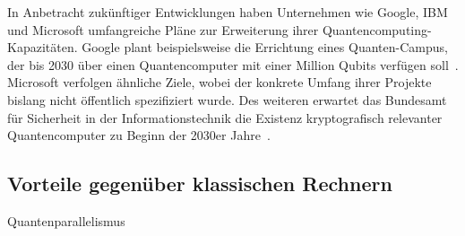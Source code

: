 In Anbetracht zukünftiger Entwicklungen haben Unternehmen wie Google, IBM und Microsoft umfangreiche Pläne zur Erweiterung ihrer Quantencomputing-Kapazitäten. 
Google plant beispielsweise die Errichtung eines Quanten-Campus, der bis 2030 über einen Quantencomputer mit einer Million Qubits verfügen soll~\cite{Google_2023}. 
Microsoft verfolgen ähnliche Ziele, wobei der konkrete Umfang ihrer Projekte bislang nicht öffentlich spezifiziert wurde.
Des weiteren erwartet das Bundesamt für Sicherheit in der Informationstechnik die Existenz kryptografisch relevanter Quantencomputer zu Beginn der 2030er Jahre~\cite{BSI_KPMG_2023}. 

\subsection{Vorteile gegenüber klassischen Rechnern} 
Quantenparallelismus 
